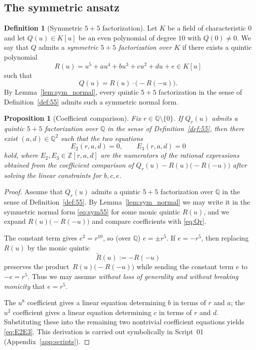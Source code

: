 \documentclass[12pt]{article}
\newtheorem{proposition}{Proposition}
\theoremstyle{remark}
\theoremstyle{definition}
\newtheorem{definition}{Definition}
\begin{document}
\subsection{The symmetric ansatz}
\begin{definition}[Symmetric $5+5$ factorization]\label{def:sym55}
Let $K$ be a field of characteristic $0$ and let $Q(u)\in K[u]$ be an even polynomial of degree $10$ with $Q(0)\neq 0$.
We say that $Q$ admits a \emph{symmetric $5+5$ factorization over $K$} if there exists a quintic polynomial
\[
R(u)=u^5+a u^4+b u^3+c u^2+d u+e\in K[u]
\]
such that
\begin{equation}\label{eq:sym55}
Q(u)=R(u)\cdot\bigl(-R(-u)\bigr).
\end{equation}
By Lemma~\ref{lem:sym_normal}, every quintic $5+5$ factorization in the sense of Definition~\ref{def:55} admits such a symmetric normal form.
\end{definition}

\begin{proposition}[Coefficient comparison]\label{prop:coeff}
Fix $r\in\mathbb{Q}\setminus\{0\}$.
If $Q_r(u)$ admits a quintic $5+5$ factorization over $\mathbb{Q}$ in the sense of Definition~\ref{def:55}, then there exist $(a,d)\in\mathbb{Q}^2$ such that the two equations
\begin{equation}\label{eq:E2E3}
E_2(r,a,d)=0,\qquad E_3(r,a,d)=0
\end{equation}
hold, where $E_2,E_3\in\mathbb{Z}[r,a,d]$ are the numerators of the rational expressions obtained from the coefficient comparison of
$Q_r(u)-R(u)\bigl(-R(-u)\bigr)$ after solving the linear constraints for $b,c,e$.
\end{proposition}

\begin{proof}
Assume that $Q_r(u)$ admits a quintic $5+5$ factorization over $\mathbb{Q}$ in the sense of Definition~\ref{def:55}. By Lemma~\ref{lem:sym_normal} we may write it in the symmetric normal form \eqref{eq:sym55} for some monic quintic $R(u)$, and we expand $R(u)\bigl(-R(-u)\bigr)$ and compare coefficients with \eqref{eq:Qr}.

The constant term gives $e^2=r^{10}$, so (over $\mathbb{Q}$) $e=\pm r^5$.
If $e=-r^5$, then replacing $R(u)$ by the monic quintic
\[
\widetilde R(u):=-R(-u)
\]
preserves the product \(\,R(u)\bigl(-R(-u)\bigr)\) while sending the constant term \(e\) to \(-e=r^5\).
Thus we may assume \emph{without loss of generality and without breaking monicity} that \(e=r^5\).

The $u^8$ coefficient gives a linear equation determining $b$ in terms of $r$ and $a$; the $u^2$ coefficient gives a linear equation determining $c$ in terms of $r$ and $d$.
Substituting these into the remaining two nontrivial coefficient equations yields \eqref{eq:E2E3}.
This derivation is carried out symbolically in Script~01 (Appendix~\ref{app:scripts}).
\end{proof}
\end{document}

